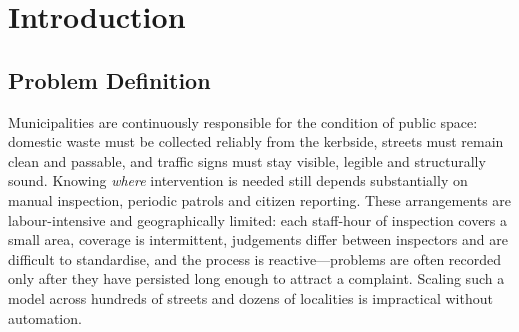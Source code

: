 
\chapter{Introduction}
\label{ch:introduction}

\section{Problem Definition}
\label{sec:problem-definition}

Municipalities are continuously responsible for the condition of public space: domestic waste must be collected reliably from the kerbside, streets must remain clean and passable, and traffic signs must stay visible, legible and structurally sound. Knowing \emph{where} intervention is needed still depends substantially on manual inspection, periodic patrols and citizen reporting. These arrangements are labour-intensive and geographically limited: each staff-hour of inspection covers a small area, coverage is intermittent, judgements differ between inspectors and are difficult to standardise, and the process is reactive---problems are often recorded only after they have persisted long enough to attract a complaint. Scaling such a model across hundreds of streets and dozens of localities is impractical without automation.


